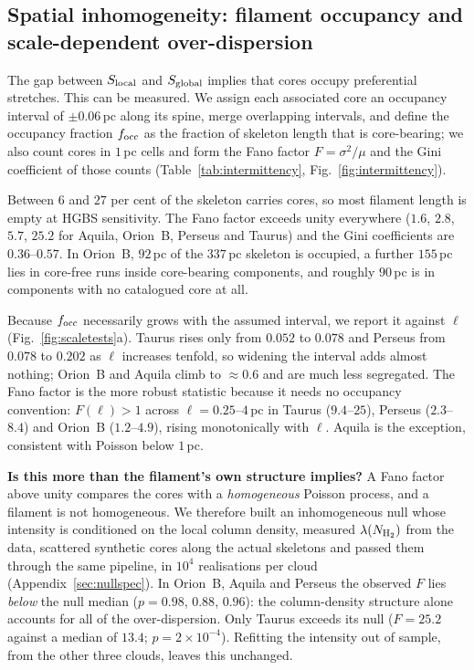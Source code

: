 \documentclass[usenatbib,twoside,twocolumn]{mnras}
\begin{document}
\subsection{Spatial inhomogeneity: filament occupancy and scale-dependent over-dispersion}
\label{sec:intermittency}

The gap between $S_{\rm local}$ and $S_{\rm global}$ implies that cores occupy preferential stretches. This can be measured. We assign each associated core an occupancy interval of $\pm0.06$\,pc along its spine, merge overlapping intervals, and define the occupancy fraction $f_{\rm occ}$ as the fraction of skeleton length that is core-bearing; we also count cores in $1$\,pc cells and form the Fano factor $F=\sigma^2/\mu$ and the Gini coefficient of those counts (Table~\ref{tab:intermittency}, Fig.~\ref{fig:intermittency}).

Between $6$ and $27$ per cent of the skeleton carries cores, so most filament length is empty at HGBS sensitivity. The Fano factor exceeds unity everywhere ($1.6$, $2.8$, $5.7$, $25.2$ for Aquila, Orion~B, Perseus and Taurus) and the Gini coefficients are $0.36$--$0.57$. In Orion~B, $92$\,pc of the $337$\,pc skeleton is occupied, a further $155$\,pc lies in core-free runs inside core-bearing components, and roughly $90$\,pc is in components with no catalogued core at all.

Because $f_{\rm occ}$ necessarily grows with the assumed interval, we report it against $\ell$ (Fig.~\ref{fig:scaletests}a). Taurus rises only from $0.052$ to $0.078$ and Perseus from $0.078$ to $0.202$ as $\ell$ increases tenfold, so widening the interval adds almost nothing; Orion~B and Aquila climb to $\approx0.6$ and are much less segregated. The Fano factor is the more robust statistic because it needs no occupancy convention: $F(\ell)>1$ across $\ell=0.25$--$4$\,pc in Taurus ($9.4$--$25$), Perseus ($2.3$--$8.4$) and Orion~B ($1.2$--$4.9$), rising monotonically with $\ell$. Aquila is the exception, consistent with Poisson below $1$\,pc.

\smallskip\noindent\textbf{Is this more than the filament's own structure implies?} A Fano factor above unity compares the cores with a \emph{homogeneous} Poisson process, and a filament is not homogeneous. We therefore built an inhomogeneous null whose intensity is conditioned on the local column density, measured $\lambda(N_{\rm H_2})$ from the data, scattered synthetic cores along the actual skeletons and passed them through the same pipeline, in $10^4$ realisations per cloud (Appendix~\ref{sec:nullspec}). In Orion~B, Aquila and Perseus the observed $F$ lies \emph{below} the null median ($p=0.98$, $0.88$, $0.96$): the column-density structure alone accounts for all of the over-dispersion. Only Taurus exceeds its null ($F=25.2$ against a median of $13.4$; $p=2\times10^{-4}$). Refitting the intensity out of sample, from the other three clouds, leaves this unchanged.
\end{document}
